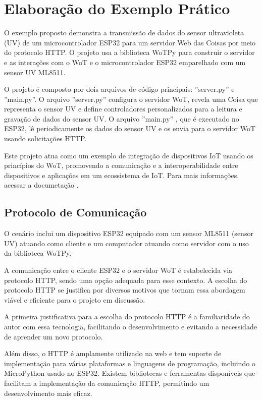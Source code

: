 \section{Elaboração do Exemplo Prático}

O exemplo proposto demonstra a transmissão de dados do sensor ultravioleta (UV) de um microcontrolador ESP32 para um servidor Web das Coisas por meio do protocolo HTTP. O projeto usa a biblioteca WoTPy para construir o servidor e as interações com o WoT e o microcontrolador ESP32 emparelhado com um sensor UV ML8511.

O projeto é composto por dois arquivos de código principais: ''server.py'' e ''main.py''. O arquivo ''server.py'' \cite{gitwotpy:server} configura o servidor WoT, revela uma Coisa que representa o sensor UV e define controladores personalizados para a leitura e gravação de dados do sensor UV. O arquivo ''main.py'' \cite{gitwotpy:main}, que é executado no ESP32, lê periodicamente os dados do sensor UV e os envia para o servidor WoT usando solicitações HTTP.

Este projeto atua como um exemplo de integração de dispositivos IoT usando os princípios do WoT, promovendo a comunicação e a interoperabilidade entre dispositivos e aplicações em um ecossistema de IoT. Para mais informações, acessar a documetação \cite{gitwotpy:read}.

\subsection{Protocolo de Comunicação}

O cenário inclui um dispositivo ESP32 equipado com um sensor ML8511 (sensor UV) atuando como cliente e um computador atuando como servidor com o uso da biblioteca WoTPy.

A comunicação entre o cliente ESP32 e o servidor WoT é estabelecida via protocolo HTTP, sendo uma opção adequada para esse contexto. A escolha do protocolo HTTP se justifica por diversos motivos que tornam essa abordagem viável e eficiente para o projeto em discussão.

A primeira justificativa para a escolha do protocolo HTTP é a familiaridade do autor com essa tecnologia, facilitando o desenvolvimento e evitando a necessidade de aprender um novo protocolo.

Além disso, o HTTP é amplamente utilizado na web e tem suporte de implementação para várias plataformas e linguagens de programação, incluindo o MicroPython usado no ESP32. Existem bibliotecas e ferramentas disponíveis que facilitam a implementação da comunicação HTTP, permitindo um desenvolvimento mais eficaz.

